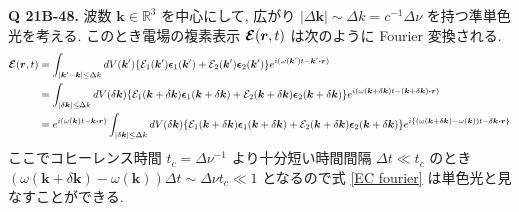 \documentclass[uplatex,dvipdfmx,a4paper,11pt]{jlreq}
\newcommand{\RR}{\mathbb{R}}
\newcommand{\rr}{\bm{r}}
\newcommand{\kk}{\bm{k}}
\newcommand{\Ec}{\mathcal{E}}
\newcommand{\EC}{\vb*{\mathcal{E}}}
\newcommand{\ee}{\bm{\epsilon}}
\theoremstyle{definition}
\begin{document}
\textbf{Q 21B-48.}
波数 $\kk\in\RR^3$ を中心にして, 広がり $|\Delta\kk|\sim\Delta k = c^{-1}\Delta\nu$ を持つ準単色光を考える. このとき電場の複素表示 $\EC(\rr, t)$ は次のように Fourier 変換される.
\begin{align}
  \EC(\rr, t)
   & = \int_{|\kk' - \kk|\leq\Delta k}dV(\kk')\qty{\Ec_1(\kk')\ee_1(\kk') + \Ec_2(\kk')\ee_2(\kk')}e^{i(\omega(\kk')t - \kk'\vdot\rr)}                                                                                                                                         \\
   & = \int_{|\delta\kk|\leq\Delta k}dV(\delta\kk)\qty{\Ec_1(\kk + \delta\kk)\ee_1(\kk + \delta\kk) + \Ec_2(\kk + \delta\kk)\ee_2(\kk + \delta\kk)}e^{i(\omega(\kk + \delta\kk)t - (\kk + \delta\kk)\vdot\rr)}                                                                 \\
   & = e^{i(\omega(\kk)t - \kk\vdot\rr)}\int_{|\delta\kk|\leq\Delta k}dV(\delta\kk)\qty{\Ec_1(\kk + \delta\kk)\ee_1(\kk + \delta\kk) + \Ec_2(\kk + \delta\kk)\ee_2(\kk + \delta\kk)}e^{i\qty{(\omega(\kk + \delta\kk) - \omega(\kk))t - \delta\kk\vdot\rr}} \label{EC fourier} \\
\end{align}
ここでコヒーレンス時間 $t_c = \Delta\nu^{-1}$ より十分短い時間間隔 $\Delta t \ll t_c$ のとき $(\omega(\kk + \delta\kk) - \omega(\kk))\Delta t \sim \Delta\nu t_c \ll 1$ となるので式 \eqref{EC fourier} は単色光と見なすことができる. \\
\end{document}

